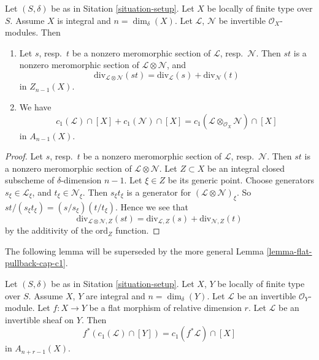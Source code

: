 \begin{lemma}
\label{lemma-c1-additive}
Let $(S, \delta)$ be as in Sitation \ref{situation-setup}.
Let $X$ be locally of finite type over $S$. Assume $X$ is
integral and $n = \dim_\delta(X)$.
Let $\mathcal{L}$, $\mathcal{N}$ be invertible $\mathcal{O}_X$-modules.
Then
\begin{enumerate}
\item Let $s$, resp.\ $t$ be a nonzero meromorphic section
of $\mathcal{L}$, resp.\ $\mathcal{N}$. Then $st$ is a nonzero
meromorphic section of $\mathcal{L} \otimes \mathcal{N}$, and
$$
\text{div}_{\mathcal{L} \otimes \mathcal{N}}(st)
=
\text{div}_{\mathcal{L}}(s) + \text{div}_{\mathcal{N}}(t)
$$
in $Z_{n - 1}(X)$.
\item We have
$$
c_1(\mathcal{L}) \cap [X] + c_1(\mathcal{N}) \cap [X] =
c_1(\mathcal{L} \otimes_{\mathcal{O}_X} \mathcal{N}) \cap [X]
$$
in $A_{n - 1}(X)$.
\end{enumerate}
\end{lemma}

\begin{proof}
Let $s$, resp.\ $t$ be a nonzero meromorphic section
of $\mathcal{L}$, resp.\ $\mathcal{N}$. Then $st$ is a nonzero
meromorphic section of $\mathcal{L} \otimes \mathcal{N}$.
Let $Z \subset X$ be an integral closed subscheme of
$\delta$-dimension $n - 1$. Let $\xi \in Z$ be its generic
point. Choose generators $s_\xi \in \mathcal{L}_\xi$, and
$t_\xi \in \mathcal{N}_\xi$. Then $s_\xi t_\xi$ is a generator
for $(\mathcal{L} \otimes \mathcal{N})_\xi$.
So $st/(s_\xi t_\xi) = (s/s_\xi)(t/t_\xi)$.
Hence we see that
$$
\text{div}_{\mathcal{L} \otimes \mathcal{N}, Z}(st)
=
\text{div}_{\mathcal{L}, Z}(s) + \text{div}_{\mathcal{N}, Z}(t)
$$
by the additivity of the $\text{ord}_Z$ function.
\end{proof}

\noindent
The following lemma will be superseded by the more general
Lemma \ref{lemma-flat-pullback-cap-c1}.

\begin{lemma}
\label{lemma-flat-pullback-divisor-invertible-sheaf}
Let $(S, \delta)$ be as in Sitation \ref{situation-setup}.
Let $X$, $Y$ be locally of finite type over $S$. Assume $X$, $Y$
are integral and $n = \dim_\delta(Y)$.
Let $\mathcal{L}$ be an invertible $\mathcal{O}_Y$-module.
Let $f : X \to Y$ be a flat morphism of relative dimension $r$.
Let $\mathcal{L}$ be an invertible sheaf on $Y$. Then
$$
f^*(c_1(\mathcal{L}) \cap [Y]) = c_1(f^*\mathcal{L}) \cap [X]
$$
in $A_{n + r - 1}(X)$.
\end{lemma}

